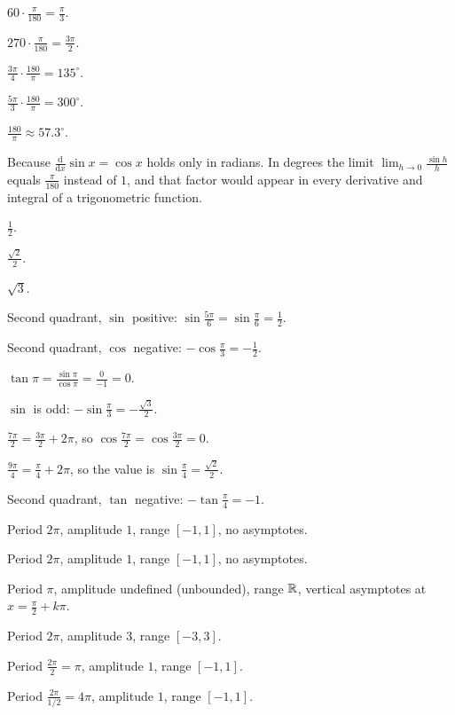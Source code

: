 \begin{solutions}
  \item $60\cdot\tfrac{\pi}{180}=\tfrac{\pi}{3}$.
  \item $270\cdot\tfrac{\pi}{180}=\tfrac{3\pi}{2}$.
  \item $\tfrac{3\pi}{4}\cdot\tfrac{180}{\pi}=135^{\circ}$.
  \item $\tfrac{5\pi}{3}\cdot\tfrac{180}{\pi}=300^{\circ}$.
  \item $\tfrac{180}{\pi}\approx57.3^{\circ}$.
  \item Because $\tfrac{\mathrm{d}}{\mathrm{d}x}\sin x=\cos x$ holds only
        in radians. In degrees the limit
        $\lim_{h\to0}\tfrac{\sin h}{h}$ equals $\tfrac{\pi}{180}$ instead
        of $1$, and that factor would appear in every derivative and integral
        of a trigonometric function.
  \item $\tfrac12$.
  \item $\tfrac{\sqrt2}{2}$.
  \item $\sqrt3$.
  \item Second quadrant, $\sin$ positive:
        $\sin\tfrac{5\pi}{6}=\sin\tfrac{\pi}{6}=\tfrac12$.
  \item Second quadrant, $\cos$ negative:
        $-\cos\tfrac{\pi}{3}=-\tfrac12$.
  \item $\tan\pi=\tfrac{\sin\pi}{\cos\pi}=\tfrac{0}{-1}=0$.
  \item $\sin$ is odd: $-\sin\tfrac{\pi}{3}=-\tfrac{\sqrt3}{2}$.
  \item $\tfrac{7\pi}{2}=\tfrac{3\pi}{2}+2\pi$, so
        $\cos\tfrac{7\pi}{2}=\cos\tfrac{3\pi}{2}=0$.
  \item $\tfrac{9\pi}{4}=\tfrac{\pi}{4}+2\pi$, so the value is
        $\sin\tfrac{\pi}{4}=\tfrac{\sqrt2}{2}$.
  \item Second quadrant, $\tan$ negative:
        $-\tan\tfrac{\pi}{4}=-1$.
  \item Period $2\pi$, amplitude $1$, range $[-1,1]$, no asymptotes.
  \item Period $2\pi$, amplitude $1$, range $[-1,1]$, no asymptotes.
  \item Period $\pi$, amplitude undefined (unbounded), range $\mathbb{R}$,
        vertical asymptotes at $x=\tfrac{\pi}{2}+k\pi$.
  \item Period $2\pi$, amplitude $3$, range $[-3,3]$.
  \item Period $\tfrac{2\pi}{2}=\pi$, amplitude $1$, range $[-1,1]$.
  \item Period $\tfrac{2\pi}{1/2}=4\pi$, amplitude $1$, range $[-1,1]$.

\end{solutions}
